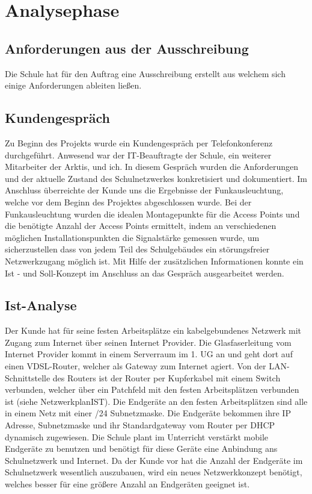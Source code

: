 \section{Analysephase} 
\label{sec:Analysephase}
\subsection{Anforderungen aus der Ausschreibung}
\label{sec:Anforderungen aus der Ausschreibung}
Die Schule hat für den Auftrag eine Ausschreibung erstellt aus welchem sich einige Anforderungen ableiten ließen.
\subsection{Kundengespräch}
\label{sec:Kundengespräch}
Zu Beginn des Projekts wurde ein Kundengespräch per Telefonkonferenz durchgeführt. Anwesend war der IT-Beauftragte der Schule, ein weiterer Mitarbeiter der Arktis, und ich. In diesem Gespräch wurden die Anforderungen und der aktuelle Zustand des Schulnetzwerkes konkretisiert und dokumentiert. Im Anschluss überreichte der Kunde uns die Ergebnisse der Funkausleuchtung, welche vor dem Beginn des Projektes abgeschlossen wurde. Bei der Funkausleuchtung wurden die idealen Montagepunkte für die Access Points  und die benötigte Anzahl der Access Points ermittelt, indem an verschiedenen möglichen Installationspunkten die Signalstärke gemessen wurde, um sicherzustellen dass von jedem Teil des Schulgebäudes ein störungsfreier Netzwerkzugang möglich ist. Mit Hilfe der zusätzlichen Informationen konnte ein Ist - und Soll-Konzept im Anschluss an das Gespräch ausgearbeitet werden.

\subsection{Ist-Analyse} 
\label{sec:IstAnalyse}
Der Kunde hat für seine festen Arbeitsplätze ein kabelgebundenes Netzwerk mit Zugang zum Internet über seinen Internet Provider. 
Die Glasfaserleitung vom Internet Provider kommt in einem Serverraum im 1. \ac{UG} an und geht dort auf einen \ac{VDSL}-Router, welcher als Gateway zum Internet agiert. Von der \ac{LAN}-Schnittstelle des Routers ist der Router per Kupferkabel mit einem Switch verbunden, welcher über ein Patchfeld mit den festen Arbeitsplätzen verbunden ist (siehe NetzwerkplanIST). Die Endgeräte an den festen Arbeitsplätzen sind alle in einem Netz mit einer /24 Subnetzmaske. Die Endgeräte bekommen ihre IP Adresse, Subnetzmaske und ihr Standardgateway vom Router per \ac{DHCP} dynamisch zugewiesen. Die Schule plant im Unterricht verstärkt mobile Endgeräte zu benutzen und benötigt für diese Geräte eine Anbindung ans Schulnetzwerk und Internet. Da der Kunde vor hat die Anzahl der Endgeräte im Schulnetzwerk wesentlich auszubauen, wird ein neues Netzwerkkonzept benötigt, welches besser für eine größere Anzahl an Endgeräten geeignet ist. 


